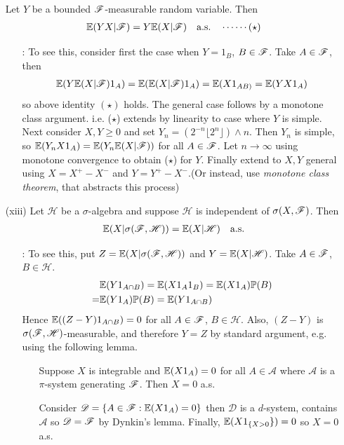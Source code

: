 \documentclass[12pt,a4paper]{report}
\begin{document}
\begin{itemize}
Let $Y$ be a bounded $\mathscr{F}$-measurable random variable. Then 
\begin{align*}
\mathbb{E}(YX|\mathscr{F})  = Y\mathbb{E}(X|\mathscr{F}) \quad \text{a.s.} \quad \cdots\cdots (\star)
\end{align*}
\begin{itemize}
\item[:] To see this, consider first the case when $Y=1_B$, $B\in \mathscr{F}$. Take $A\in \mathscr{F}$, then
\begin{align*}
\mathbb{E}(Y\mathbb{E}(X|\mathscr{F}) 1_A) = \mathbb{E}(\mathbb{E}(X|\mathscr{F})1_A) = \mathbb{E}(X1_{AB)} = \mathbb{E}(YX1_A) 
\end{align*}
so above identity $(\star)$ holds. The general case follows by a monotone class argument. i.e. ($\star$) extends by linearity to case where $Y$ is simple. Next consider $X,Y\geq 0$ and set $Y_n = (2^{-n} \lfloor 2^n \rfloor)\wedge n$. Then $Y_n$ is simple, so $\mathbb{E}(Y_n X 1_A) = \mathbb{E}(Y_n \mathbb{E}(X|\mathscr{F}))$ for all $A\in \mathscr{F}$. Let $n\rightarrow \infty$ using monotone convergence to obtain ($\star$) for $Y$. Finally extend to $X,Y$ general using $X = X^+ - X^-$ and $Y=Y^+ - X^-$.(Or instead, use \emph{monotone class theorem}, that abstracts this process)
\end{itemize}
\item[(xiii)] Let $\mathscr{H}$ be a $\sigma$-algebra and suppose $\mathscr{H}$ is independent of $\sigma(X,\mathscr{F})$. Then
\begin{align*}
\mathbb{E}(X|\sigma(\mathscr{F}, \mathscr{H})) = \mathbb{E}(X|\mathscr{H}) \quad \text{a.s.}
\end{align*}
\begin{itemize}
\item[:] To see this, put $Z =\mathbb{E}(X|\sigma(\mathscr{F}, \mathscr{H}))$ and $Y = \mathbb{E}(X|\mathscr{H})$. Take $A\in \mathscr{F}$, $B\in \mathscr{H}$.
\begin{align*}
&\mathbb{E}(Y 1_{A\cap B}) = \mathbb{E}(X 1_A 1_B)= \mathbb{E}(X1_A)\mathbb{P}(B) \\
=& \mathbb{E}(Y1_A) \mathbb{P}(B) = \mathbb{E}(Y1_{A\cap B})
\end{align*}
Hence $\mathbb{E}((Z-Y)1_{A\cap B})= 0$ for all $A\in \mathscr{F}$, $B\in \mathscr{H}$. Also, $(Z-Y)$ is $\sigma(\mathscr{F},\mathscr{H})$-measurable, and therefore $Y=Z$ by standard argument, e.g. using the following lemma.
\begin{itemize}
\item[] \lem Suppose $X$ is integrable and $\mathbb{E}(X1_A) = 0$ for all $A\in \mathscr{A}$ where $\mathscr{A}$ is a $\pi$-system generating $\mathscr{F}$. Then $X=0$ a.s.

\pf Consider $\mathscr{D}  = \{A\in \mathscr{F} : \mathbb{E}(X1_A) =0\}$ then $\mathscr{D}$ is a $d$-system, contains $\mathscr{A}$ so $\mathscr{D} = \mathscr{F}$ by Dynkin's lemma. Finally, $\mathbb{E}(X 1_{ \{X>0}\} ) =0$ so $X=0$ a.s.
\end{itemize}
\end{itemize}
\end{itemize}
\s
\end{document}
